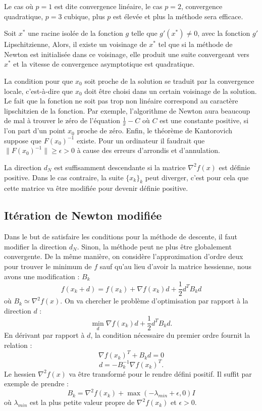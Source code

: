 Le cas o\`u $p=1$ est dite convergence lin\'eaire, le cas $p=2$, convergence quadratique, $p=3$ cubique, plus $p$
est \'elev\'ee et plus la m\'ethode sera efficace.

\begin{frtheoreme}
Soit $x^*$ une racine isol\'ee de la fonction $g$ telle que $g'(x^*)\neq 0$, avec la fonction $g'$ Lipschitzienne,
 Alors, il existe un voisinage de $x^*$ tel que si la m\'ethode de Newton
est initialis\'ee dans ce voisinage, elle produit une suite convergeant vers $x^*$ et la vitesse de convergence
asymptotique est quadratique.
\end{frtheoreme}


La condition pour que $x_0$ soit proche de la solution se traduit par la convergence locale, c'est-\`a-dire que $x_0$ doit
être choisi dans un certain voisinage de la solution.
Le fait que la fonction ne soit pas trop non lin\'eaire correspond au caract\`ere lipschitzien
de la fonction. Par exemple, l'algorithme de Newton aura beaucoup de mal \`a trouver le z\'ero de l'\'equation
$\frac{1}{x}-C$ o\`u $C$ est une constante positive, si l'on part d'un point $x_0$ proche de z\'ero.
 Enfin, le th\'eor\`eme de Kantorovich suppose que $F(x_0)^{-1}$ existe. Pour un
ordinateur il faudrait que $\lVert F(x_0)^{-1}\rVert \geq \epsilon>0$ \`a cause des erreurs
d'arrondis et d'annulation.

La direction $d_N$ est suffisamment descendante si la matrice $\nabla^2 f(x)$ est d\'efinie positive. Dans le
cas contraire, la suite $\{x_k\}_k$ peut diverger, c'est pour cela que cette matrice va être modifi\'ee pour
devenir d\'efinie positive.

\subsection{It\'eration de Newton modifi\'ee}

Dans le but de satisfaire les conditions pour la m\'ethode de descente, il faut modifier la direction $d_N$.
 Sinon, la m\'ethode peut ne plus être globalement convergente.
De la même mani\`ere, on consid\`ere l'approximation d'ordre deux pour trouver le minimum de $f$ sauf qu'au lieu
d'avoir la matrice hessienne, nous avons une modification : $B_k$
$$f(x_k+d)=f(x_k)+\nabla f(x_k)d+\frac{1}{2}d^TB_kd$$
o\`u $B_k\simeq \nabla^2f(x)$. On va chercher le probl\`eme d'optimisation par rapport \`a la direction $d$ :
$$\min_d\nabla f(x_k)d+\frac{1}{2}d^TB_kd.$$
En d\'erivant par rapport \`a $d$, la condition n\'ecessaire du premier ordre fournit la relation :
$$\nabla f(x_k)^T+B_kd=0$$
$$d=-B_k^{-1}\nabla f(x_k)^T.$$
Le hessien $\nabla^2f(x)$ va être transform\'e pour le rendre d\'efini positif. Il suffit par exemple de prendre :
$$B_k=\nabla^2 f(x_k)+\max(-\lambda_{min}+\epsilon,0)I$$
o\`u $\lambda_{min}$ est la plus petite valeur propre de $\nabla^2 f(x_k)$ et $\epsilon>0$.


